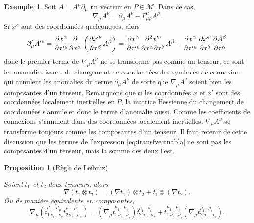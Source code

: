 \documentclass[a4paper,11pt]{report}
\theoremstyle{definition}
\theoremstyle{plain}
\newtheorem{prop}[thm]{Proposition}
\theoremstyle{definition}
\newtheorem{exmp}{Exemple}[chapter]
\theoremstyle{remark}
\newcommand{\M}{\mathscr{M}}
\newcommand{\p}{\partial}
\begin{document}
                \begin{exmp}
                    Soit $A = A^\mu\p_\mu$ un vecteur en $P\in\M$. Dans ce cas, 
                    \begin{equation}
                        \nabla_\mu A^\nu = \p_\mu A^\nu+\Gamma^\nu_{\mu\rho}A^\rho.
                    \end{equation}
                    Si $x'$ sont des coordonnées quelconques, alors
                    \begin{equation}
                        \p'_\mu A'^\nu  = \pdv{x^\alpha}{x'^\mu}\pdv{}{x^\alpha}\left( \pdv{x'^\nu}{x^\beta}A^\beta \right) = \pdv{x^\alpha}{x'^\mu}\pdv{x'^\nu}{x^\alpha}{x^\beta}A^\beta+\pdv{x^\alpha}{x'^\mu}\pdv{x'^\nu}{x^\beta}\pdv{A^\beta}{x^\alpha}\label{eq:transfvectnabla}
                    \end{equation}
                    donc le premier terme de $\nabla_\mu A^\nu$ ne se transforme pas comme un tenseur, ce sont les anomalies issues du changement de coordonnées des symboles de connexion qui annulent les anomalies du terme $\p_\mu A^\nu$ de sorte que $\nabla_\mu A^\nu$ soient bien les composantes d'un tenseur. Remarquons que si les coordonnées $x$ et $x'$ sont des coordonnées localement inertielles en $P$, la matrice Hessienne du changement de coordonnées s'annule et donc le terme d'anomalie aussi. Comme les coefficients de connexions s'annulent dans des coordonnées localement inertielles, $\nabla_\mu A^\nu$ se transforme toujours comme les composantes d'un tenseur. Il faut retenir de cette discussion que les termes de l'expression \ref{eq:transfvectnabla} ne sont pas les composantes d'un tenseur, mais la somme des deux l'est.
                \end{exmp}
                
                \begin{prop}[Règle de Leibniz]\begin{leftbar}
                    Soient $t_1$ et $t_2$ deux tenseurs, alors
                    \begin{equation}
                        \nabla(t_1\otimes t_2) = (\nabla t_1)\otimes t_2 + t_1\otimes(\nabla t_2).
                    \end{equation}
                    Ou de manière équivalente en composantes,
                    \begin{equation}
                         \nabla_\mu (t^{\mu_1\dots\mu_p}_{1~\nu_i\dots\nu_q}t^{\rho_1\dots\rho_r}_{2~\sigma_i\dots\sigma_s}) = (\nabla_\mu t^{\mu_1\dots\mu_p}_{1~\nu_i\dots\nu_q})t^{\rho_1\dots\rho_r}_{2~\sigma_i\dots\sigma_s} + t^{\mu_1\dots\mu_p}_{1~\nu_i\dots\nu_q} (\nabla_\mu t^{\rho_1\dots\rho_r}_{2~\sigma_i\dots\sigma_s}).
                    \end{equation}
                \end{leftbar}\end{prop}
                
\end{document}

